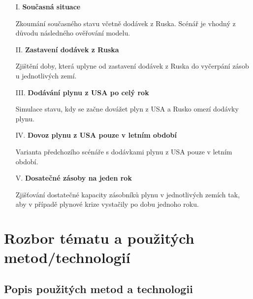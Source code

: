 \documentclass[a4paper,11pt]{article}
\begin{document}
\begin{enumerate}
\item[I.] \textbf{Současná situace}

Zkoumání současného stavu včetně dodávek z Ruska.
Scénář je vhodný z důvodu následného ověřování modelu.

\item[II.] \textbf{Zastavení dodávek z Ruska}

Zjištění doby, která uplyne od zastavení dodávek z Ruska do vyčerpání zásob u jednotlivých zemí.

\item[III.] \textbf{Dodávání plynu z USA po celý rok}

Simulace stavu, kdy se začne dovážet plyn z USA a Rusko omezí dodávky plynu.

\item[IV.] \textbf{Dovoz plynu z USA pouze v letním období}

Varianta předchozího scénáře s dodávkami plynu z USA pouze v letním období.

\item[V.] \textbf{Dosatečné zásoby na jeden rok}

Zjišťování dostatečné kapacity zásobníků plynu v jednotlivých zemích
tak, aby v případě plynové krize vystačily po dobu jednoho roku.
\end{enumerate}

\newpage

\section{Rozbor tématu a použitých metod/technologií}




\subsection{Popis použitých metod a technologii}
\end{document}
